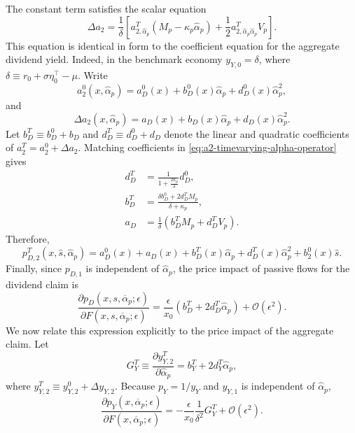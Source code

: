 The constant term satisfies the scalar equation
\begin{equation}\label{eq:a2-timevarying-alpha-operator}
    \Delta a_2
    =\frac{1}{\delta}\left[
        a_{2,\hat{\alpha}_p}^{T}(M_p-\kappa_p\hat{\alpha}_p)
        +\frac{1}{2}a_{2,\hat{\alpha}_p\hat{\alpha}_p}^{T}V_p
    \right].
\end{equation}
This equation is identical in form to the coefficient equation for the aggregate dividend yield.
Indeed, in the benchmark economy $y_{Y,0}=\delta$, where $\delta\equiv r_0+\sigma\eta_0^\top-\mu$.
Write
\begin{equation}
    a_2^{0}(x,\hat{\alpha}_p)=a_D^{0}(x)+b_D^{0}(x)\hat{\alpha}_p+d_D^{0}(x)\hat{\alpha}_p^2,
\end{equation}
and
\begin{equation}
    \Delta a_2(x,\hat{\alpha}_p)=a_D(x)+b_D(x)\hat{\alpha}_p+d_D(x)\hat{\alpha}_p^2.
\end{equation}
Let $b_D^T\equiv b_D^0+b_D$ and $d_D^T\equiv d_D^0+d_D$ denote the linear and quadratic coefficients of $a_2^T=a_2^0+\Delta a_2$.
Matching coefficients in \eqref{eq:a2-timevarying-alpha-operator} gives
\begin{align}
    d_D^T
    &=\frac{1}{1+\frac{2\kappa_p}{\delta}}d_D^{0},\\
    b_D^T
    &=\frac{\delta b_D^{0}+2d_D^T M_p}{\delta+\kappa_p},\\
    a_D
    &=\frac{1}{\delta}\left(b_D^T M_p+d_D^T V_p\right).
\end{align}
Therefore,
\begin{equation}\label{eq:pD2-timevarying-alpha-solution}
    p_{D,2}^{T}(x,\hat{s},\hat{\alpha}_p)
    =a_D^{0}(x)+a_D(x)+b_D^T(x)\hat{\alpha}_p+d_D^T(x)\hat{\alpha}_p^2
    +b_2^{0}(x)\hat{s}.
\end{equation}
Finally, since $p_{D,1}$ is independent of $\hat{\alpha}_p$, the price impact of passive flows for the dividend claim is
\begin{equation}\label{eq:pD-price-impact-timevarying-alpha}
    \frac{\partial p_D(x,s,\overline{\alpha}_p;\epsilon)}{\partial F(x,s,\overline{\alpha}_p;\epsilon)}
    =\frac{\epsilon}{x_0}\left(b_D^T+2d_D^T\hat{\alpha}_p\right)
    +\mathcal{O}(\epsilon^2).
\end{equation}
We now relate this expression explicitly to the price impact of the aggregate claim.
Let
\begin{equation}
    G_Y^T
    \equiv \frac{\partial y_{Y,2}^T}{\partial\hat{\alpha}_p}
    = b_Y^T+2d_Y^T\hat{\alpha}_p,
\end{equation}
where $y_{Y,2}^T\equiv y_{Y,2}^0+\Delta y_{Y,2}$.
Because $p_Y=1/y_Y$ and $y_{Y,1}$ is independent of $\hat{\alpha}_p$,
\begin{equation}\label{eq:pY-price-impact-timevarying-alpha}
    \frac{\partial p_Y(x,\overline{\alpha}_p;\epsilon)}{\partial F(x,\overline{\alpha}_p;\epsilon)}
    =-\frac{\epsilon}{x_0}\frac{1}{\delta^2}G_Y^T
    +\mathcal{O}(\epsilon^2).
\end{equation}


